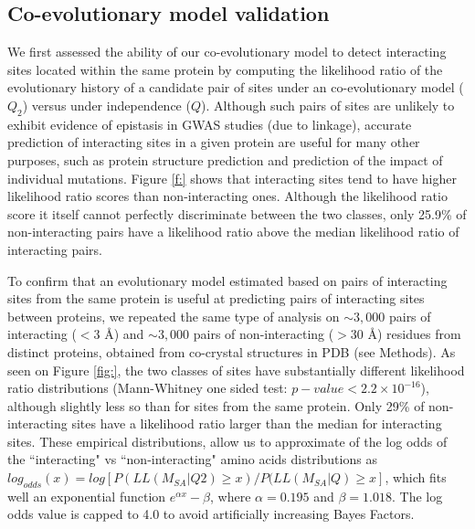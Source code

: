 \subsection{Co-evolutionary model validation}

We first assessed the ability of our co-evolutionary model to detect interacting sites located within the same protein by computing the likelihood ratio of the evolutionary history of a candidate pair of sites under an co-evolutionary model ($Q_2$) versus under independence ($Q$). Although such pairs of sites are unlikely to exhibit evidence of epistasis in GWAS studies (due to linkage), accurate prediction of interacting sites in a given protein are useful for many other purposes, such as protein structure prediction and prediction of the impact of individual mutations.  Figure \ref{f:} shows that interacting sites tend to have higher likelihood ratio scores than non-interacting ones. Although the likelihood ratio score it itself cannot perfectly discriminate between the two classes, only 25.9\% of non-interacting pairs have a likelihood ratio above the median likelihood ratio of interacting pairs. 


To confirm that an evolutionary model estimated based on pairs of interacting sites from the same protein is useful at predicting pairs of interacting sites between proteins, we repeated the same type of analysis on $\sim 3,000$ pairs of interacting ($< 3$ \AA) and $\sim 3,000$ pairs of non-interacting ($>30$ \AA) residues from distinct proteins, obtained from co-crystal structures in PDB (see Methods). As seen on Figure \ref{fig:}, the two classes of sites have substantially different likelihood ratio distributions (Mann-Whitney one sided test: $p-value < 2.2 \times 10^{-16}$), although slightly less so than for sites from the same protein. Only 29\% of non-interacting sites have a likelihood ratio larger than the median for interacting sites. These empirical distributions, allow us to approximate of the log odds of the ``interacting" vs ``non-interacting" amino acids distributions as $log_{odds}(x) = log[P(LL(M_{SA}|Q2) \ge x) / P(LL(M_{SA}|Q) \ge x]$, which fits well an exponential function $e^{\alpha x}- \beta$, where $\alpha = 0.195$ and $\beta = 1.018$. The log odds value is capped to 4.0 to avoid artificially increasing Bayes Factors. 

